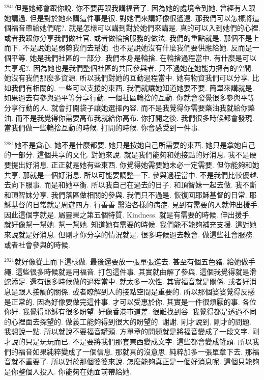 \documentclass{book}
\begin{document}
$^{2841}$但是她都會跟你說.
你不要再跟我講福音了.
因為她的處境令到她.
曾經有人跟她講過.
但是對於她來講這件事是很.
對她們來講好像很遙遠.
那我們可以怎樣將這個福音帶給她們呢?.
就是怎樣可以講到對於她們來講是.
真的可以入到她們的心裡.
或者我跟你分享我們做社官.
或者做輪捨服務的做法.
我們的重點就是.
那個不是上而下.
不是說她是弱勢我們去幫她.
也不是說她沒有什麼我們要供應給她.
反而是一個平等.
她是我們社區的一部分.
我們本身是輪捨.
在輪捨過程當中.
有什麼是可以共享呢?.
因為她也是我們整個社區的共同參與者.
只不過她在她能力擁有的空間.
她沒有我們那麼多資源.
所以我們對她的互動過程當中.
她有物資我們可以分享.
比如我們有相關的.
一些可以支援的東西.
我們就讓她知道她要不要.
簡單來講就是.
如果過去有參與過平等分享行動.
一個社區輪捨的互動.
你就會發覺很多參與平等分享行動的人.
就會打開袋子讓她選擇內容.
而不是我覺得你需要藥油我就給你藥油.
而不是我覺得你需要高布我就給你高布.
你打開之後.
我們很多時候都會發現.
當我們做一些輪捨互動的時候.
打開的時候.
你會感受到一件事.

$^{2881}$她不是貪心.
她不是什麼都要.
她只是按她自己所需要的東西.
她只是拿她自己的一部分.
這個共享的文化.
對她來說.
就是我們能夠和她接點的好消息.
我不是硬要提出好消息.
正正就是她有些東西.
你覺得她需要她未必一定需要.
但你能夠和她共享.
那就是一個好消息.
所以可能要調整一下.
參與過程當中.
不是我們比較優越.
去向下服事.
而是和她平衡.
所以我自己在過去的日子.
和頂智妹一起去做.
我不斷和頂智妹分享.
我們落區做相關的參與.
我們只不過是.
恢復回耶穌基督的日常.
耶穌基督的日常就是周遊四方.
行善善 醫治各樣的病症.
見到有需要的人就伸出援手.
因此這個字就是.
屬靈果之第五個特質.
Kindness.
就是有需要的時候.
伸出援手.
就好像幫一幫她.
幫一幫她.
知道她有需要的時候.
我們能不能夠補充支援.
這對她來說就是好消息.
但剛才你分享的情況就是.
很多時候過去教會.
做這些社會服務.
或者社會參與的時候.

$^{2921}$就好像從上而下這樣做.
最後還要放一張單張進去.
甚至有個五色豬.
給她做手繩.
這些很多時候就是用福音.
打包這件事.
其實就曲解了參與.
這個我覺得就是滑蛇添足.
還有很多時候做的過程當中.
就太多一次性.
其實福音就是關係.
或者好消息是跟人接觸的關係.
或者瞭解到人的接點空間是重要的.
所以那個婆婆覺得反感是正常的.
因為好像要做完這件事.
才可以受惠於你.
其實是一件很煩厭的事.
各位你好.
我覺得耶穌有很多盼望.
好像香港市道差.
很難找到谷.
我覺得都是透過不同的心裡面去探望的.
做義工能夠得到很大的盼望的.
謝謝.
剛才說到.
剛才的問題.
我想說一點.
所以就說不要福音罐頭.
方單章的問題就是將福音變成了一段文字.
剛才說的只是玩玩而已.
不是要將我們那套東西變成文字.
這些都會變成罐頭.
所以我們的福音如果純粹變成了一個信息.
那就真的沒意思.
純粹加多一張單章下去.
那福音就不重要了.
所以對於那個婆婆來說.
怎麼能夠真正是一個好消息呢.
這個只能夠是你整個人投入.
你能夠在她面前帶給她.
\end{document}
